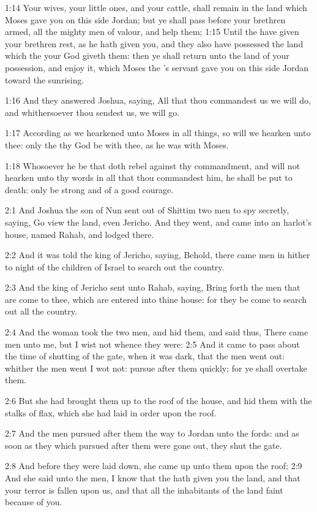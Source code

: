 1:14 Your wives, your little ones, and your cattle, shall remain in the land which Moses gave you on this side Jordan; but ye shall pass before your brethren armed, all the mighty men of valour, and help them; 1:15 Until the \LORD have given your brethren rest, as he hath given you, and they also have possessed the land which the \LORD your God giveth them: then ye shall return unto the land of your possession, and enjoy it, which Moses the \LORD's servant gave you on this side Jordan toward the sunrising.

1:16 And they answered Joshua, saying, All that thou commandest us we will do, and whithersoever thou sendest us, we will go.

1:17 According as we hearkened unto Moses in all things, so will we hearken unto thee: only the \LORD thy God be with thee, as he was with Moses.

1:18 Whosoever he be that doth rebel against thy commandment, and will not hearken unto thy words in all that thou commandest him, he shall be put to death: only be strong and of a good courage.

2:1 And Joshua the son of Nun sent out of Shittim two men to spy secretly, saying, Go view the land, even Jericho. And they went, and came into an harlot's house, named Rahab, and lodged there.

2:2 And it was told the king of Jericho, saying, Behold, there came men in hither to night of the children of Israel to search out the country.

2:3 And the king of Jericho sent unto Rahab, saying, Bring forth the men that are come to thee, which are entered into thine house: for they be come to search out all the country.

2:4 And the woman took the two men, and hid them, and said thus, There came men unto me, but I wist not whence they were: 2:5 And it came to pass about the time of shutting of the gate, when it was dark, that the men went out: whither the men went I wot not: pursue after them quickly; for ye shall overtake them.

2:6 But she had brought them up to the roof of the house, and hid them with the stalks of flax, which she had laid in order upon the roof.

2:7 And the men pursued after them the way to Jordan unto the fords: and as soon as they which pursued after them were gone out, they shut the gate.

2:8 And before they were laid down, she came up unto them upon the roof; 2:9 And she said unto the men, I know that the \LORD hath given you the land, and that your terror is fallen upon us, and that all the inhabitants of the land faint because of you.

